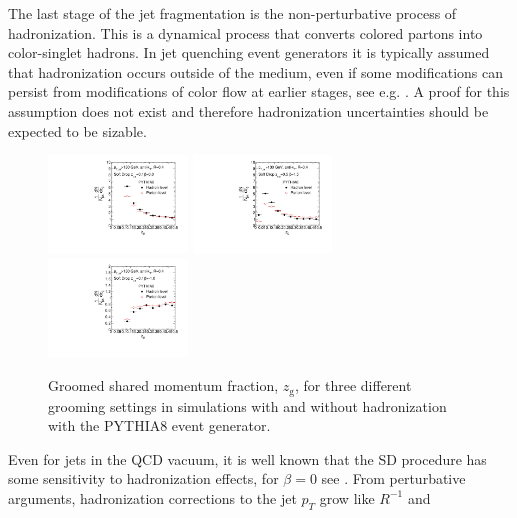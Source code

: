 The last stage of the jet fragmentation is the non-perturbative process of hadronization. This is a dynamical process that converts colored partons into color-singlet hadrons. In jet quenching event generators it is typically assumed that hadronization occurs outside of the medium, even if some modifications can persist from modifications of color flow at earlier stages, see e.g. \cite{Aurenche:2011rd,Beraudo:2011bh,Beraudo:2012bq}. A proof for this assumption does not exist and therefore hadronization uncertainties should be expected to be sizable. 

\begin{figure}[th]
\centering
\includegraphics[width=0.33\textwidth]{figures/SDGen/ZgPytHadVsPartBeta00Z01.pdf}%
\includegraphics[width=0.33\textwidth]{figures/SDGen/ZgPytHadVsPartBeta15Z05.pdf}%
\includegraphics[width=0.33\textwidth]{figures/SDGen/ZgPytHadVsPartBetam1Z01.pdf}%
\caption{Groomed shared momentum fraction, $z_{\mathrm{g}}$, for three different grooming settings in simulations with and without hadronization with the PYTHIA8 event generator.}
\label{fig:SDGenZGHadVsPart}
\end{figure}
Even for jets in the QCD vacuum, it is well known that the SD procedure has some sensitivity to hadronization effects, for $\beta = 0$ see \cite{Dasgupta:2015yua}.
From perturbative arguments, hadronization corrections to the jet $p_{T}$ grow like $R^{-1}$ \cite{Dasgupta:2007wa} and
